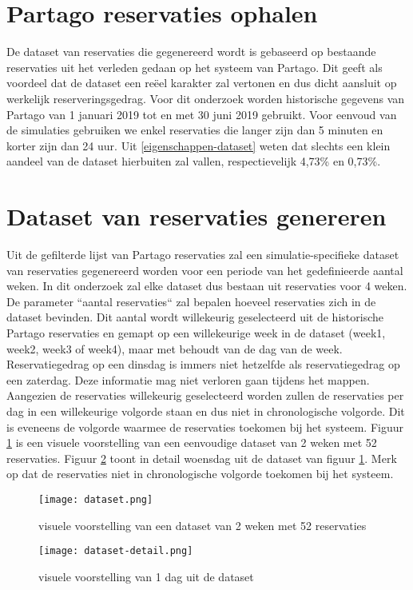 \section{Partago reservaties ophalen} \label{partago-reservaties-ophalen}
De dataset van reservaties die gegenereerd wordt is gebaseerd op bestaande reservaties uit het verleden gedaan op het systeem van Partago. Dit geeft als voordeel dat de dataset een reëel karakter zal vertonen en dus dicht aansluit op werkelijk reserveringsgedrag. Voor dit onderzoek worden historische gegevens van Partago van 1 januari 2019 tot en met 30 juni 2019 gebruikt. Voor eenvoud van de simulaties gebruiken we enkel reservaties die langer zijn dan 5 minuten en korter zijn dan 24 uur. Uit \ref{eigenschappen-dataset} weten dat slechts een klein aandeel van de dataset hierbuiten zal vallen, respectievelijk 4,73\% en 0,73\%.

\section{Dataset van reservaties genereren} \label{dataset-genereren}
Uit de gefilterde lijst van Partago reservaties zal een simulatie-specifieke dataset van reservaties gegenereerd worden voor een periode van het gedefinieerde aantal weken. In dit onderzoek zal elke dataset dus bestaan uit reservaties voor 4 weken. De parameter ``aantal reservaties`` zal bepalen hoeveel reservaties zich in de dataset bevinden. Dit aantal wordt willekeurig geselecteerd uit de historische Partago reservaties en gemapt op een willekeurige week in de dataset (week1, week2, week3 of week4), maar met behoudt van de dag van de week. Reservatiegedrag op een dinsdag is immers niet hetzelfde als reservatiegedrag op een zaterdag. Deze informatie mag  niet verloren gaan tijdens het mappen. Aangezien de reservaties willekeurig geselecteerd worden zullen de reservaties per dag in een willekeurige volgorde staan en dus niet in chronologische volgorde. Dit is eveneens de volgorde waarmee de reservaties toekomen bij het systeem. Figuur \ref{fig:visuele-voorstelling-dataset} is een visuele voorstelling van een eenvoudige dataset van 2 weken met 52 reservaties. Figuur \ref{fig:visuele-voorstelling-dag-dataset} toont in detail woensdag uit de dataset van figuur \ref{fig:visuele-voorstelling-dataset}. Merk op dat de reservaties niet in chronologische volgorde toekomen bij het systeem.
\begin{figure}[h]
	\texttt{[image: dataset.png]}
	\caption[visuele voorstelling dataset]{visuele voorstelling van een dataset van 2 weken met 52 reservaties}
	\label{fig:visuele-voorstelling-dataset}
\end{figure}
\begin{figure}[h]
	\texttt{[image: dataset-detail.png]}
	\caption[visuele voorstelling van 1 dag]{visuele voorstelling van 1 dag uit de dataset}
	\label{fig:visuele-voorstelling-dag-dataset}
\end{figure}
